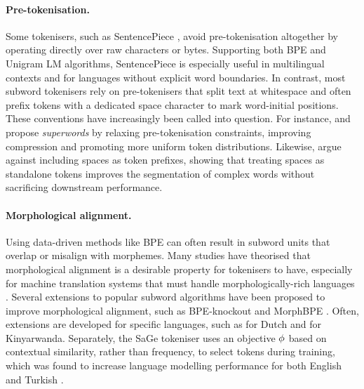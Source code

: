 \paragraph{Pre-tokenisation.} Some tokenisers, such as SentencePiece \citep{kudo-richardson-2018-sentencepiece}, avoid pre-tokenisation altogether by operating directly over raw characters or bytes. Supporting both BPE and Unigram LM algorithms, SentencePiece is especially useful in multilingual contexts and for languages without explicit word boundaries. In contrast, most subword tokenisers rely on pre-tokenisers that split text at whitespace and often prefix tokens with a dedicated space character to mark word-initial positions. These conventions have increasingly been called into question. For instance, \citet{schmidt2025boundless} and \citet{liu2025superbpespacetravellanguage} propose \emph{superwords} by relaxing pre-tokenisation constraints, improving compression and promoting more uniform token distributions. Likewise, \citet{gow-smith-etal-2022-improving} argue against including spaces as token prefixes, showing that treating spaces as standalone tokens improves the segmentation of complex words without sacrificing downstream performance.

\paragraph{Morphological alignment.} Using data-driven methods like BPE can often result in subword units that overlap or misalign with morphemes. Many studies have theorised that morphological alignment is a desirable property for tokenisers to have, especially for machine translation systems that must handle morphologically-rich languages \citep{pan2020morphological}. Several extensions to popular subword algorithms have been proposed to improve morphological alignment, such as BPE-knockout \citep{bauwens-delobelle-2024-bpe} and MorphBPE \citep{asgari2025morphbpe}. Often, extensions are developed for specific languages, such as \citet{kildeberg2025sm} for Dutch and \citet{nzeyimana-niyongabo-rubungo-2022-kinyabert} for Kinyarwanda. Separately, the SaGe tokeniser uses an objective $\phi$ based on contextual similarity, rather than frequency, to select tokens during training, which was found to increase language modelling performance for both English and Turkish \citep{yehezkel2023incorporating}. 


